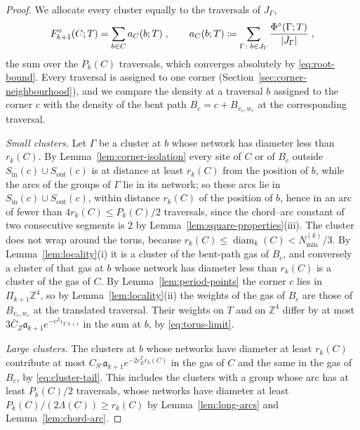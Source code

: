 \documentclass[11pt]{preprint}
\newcommand{\diam}{\operatorname{diam}}
\DeclarePairedDelimiter{\abs}{\lvert}{\rvert}
\numberwithin{equation}{section}
\theoremstyle{definition}
\theoremstyle{remark}
\theoremstyle{plain}
\begin{document}
\begin{proof}
We allocate every cluster equally to the traversals of $J_\Gamma$,
\begin{equation}\label{eq:allocation}
    F^\circ_{k+1}(C; T) = \sum_{b \in C}a_C(b; T)\;,
    \qquad
    a_C(b; T) \coloneqq \sum_{\Gamma\colon b \in J_\Gamma}\frac{\Phi^\circ(\Gamma; T)}{\abs{J_\Gamma}}\;,
\end{equation}
the sum over the $P_k(C)$ traversals, which converges absolutely by \eqref{eq:root-bound}. Every traversal is assigned to one corner (Section~\ref{sec:corner-neighbourhood}), and we compare the density at a traversal $b$ assigned to the corner $c$ with the density of the bent path $B_c = c + B_{v_c,w_c}$ at the corresponding traversal.

\emph{Small clusters.} Let $\Gamma$ be a cluster at $b$ whose network has diameter less than $r_k(C)$. By Lemma~\ref{lem:corner-isolation} every site of $C$ or of $B_c$ outside $S_{\mathrm{in}}(c) \cup S_{\mathrm{out}}(c)$ is at distance at least $r_k(C)$ from the position of $b$, while the arcs of the groups of $\Gamma$ lie in its network; so these arcs lie in $S_{\mathrm{in}}(c) \cup S_{\mathrm{out}}(c)$, within distance $r_k(C)$ of the position of $b$, hence in an arc of fewer than $4r_k(C) \leq P_k(C)/2$ traversals, since the chord--arc constant of two consecutive segments is $2$ by Lemma~\ref{lem:square-properties}(iii). The cluster does not wrap around the torus, because $r_k(C) \leq \diam_k(C) < N^{(k)}_{\min}/3$. By Lemma~\ref{lem:locality}(i) it is a cluster of the bent-path gas of $B_c$, and conversely a cluster of that gas at $b$ whose network has diameter less than $r_k(C)$ is a cluster of the gas of $C$. By Lemma~\ref{lem:period-points} the corner $c$ lies in $\Pi_{k+1}\mathbb Z^4$, so by Lemma~\ref{lem:locality}(ii) the weights of the gas of $B_c$ are those of $B_{v_c,w_c}$ at the translated traversal. Their weights on $T$ and on $\mathbb Z^4$ differ by at most $3\bar C_Z\mathfrak a_{k+1}e^{-c^Z\iota_{T,k+1}}$ in the sum at $b$, by \eqref{eq:torus-limit}.

\emph{Large clusters.} The clusters at $b$ whose networks have diameter at least $r_k(C)$ contribute at most $C_{S'}\mathfrak a_{k+1}e^{-2c^T_Er_k(C)}$ in the gas of $C$ and the same in the gas of $B_c$, by \eqref{eq:cluster-tail}. This includes the clusters with a group whose arc has at least $P_k(C)/2$ traversals, whose networks have diameter at least $P_k(C)/(2\Lambda(C)) \geq r_k(C)$ by Lemma~\ref{lem:long-arcs} and Lemma~\ref{lem:chord-arc}.


\end{proof}
\end{document}
